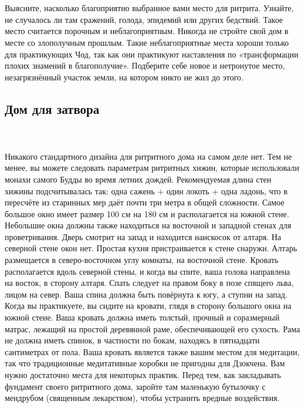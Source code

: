 \\ \\ Выясните, насколько благоприятно выбранное вами место для ритрита. Узнайте, не случалось ли там сражений, голода, эпидемий или других бедствий. Такое место считается порочным и неблагоприятным. Никогда не стройте свой дом в месте со злополучным прошлым. Такие неблагоприятные места хороши только для практикующих Чод, так как они практикуют наставления по «трансформации плохих знамений в благополучие». Подберите себе новое и нетронутое место, незагрязнённый участок земли, на котором никто не жил до этого.
\subsection{Дом для затвора}
\\ \\ Никакого стандартного дизайна для ритритного дома на самом деле нет. Тем не менее, вы можете следовать параметрам ритритных хижин, которые использовали монахи самого Будды во время летних дождей. Рекомендуемая длина стен хижины подсчитывалась так: одна сажень + один локоть + одна ладонь, что в пересчёте из старинных мер даёт почти три метра в общей сложности. Самое большое окно имеет размер 100 см на 180 см и располагается на южной стене. Небольшие окна должны также находиться на восточной и западной стенах для проветривания. Дверь смотрит на запад и находится наискосок от алтаря. На северной стене окон нет. Простая кухня пристраивается к стене снаружи. Алтарь размещается в северо-восточном углу комнаты, на восточной стене. Кровать располагается вдоль северной стены, и когда вы спите, ваша голова направлена на восток, в сторону алтаря. Спать следует на правом боку в позе спящего льва, лицом на север. Ваша спина должна быть повёрнута к югу, а ступни на запад. Когда вы практикуете, вы сидите на кровати, глядя в сторону большого окна на южной стене. Ваша кровать должна иметь толстый, прочный и соразмерный матрас, лежащий на простой деревянной раме, обеспечивающей его сухость. Рама не должна иметь спинок, в частности по бокам, находясь в пятнадцати сантиметрах от пола. Ваша кровать является также вашим местом для медитации, так что традиционные медитативные коробки не пригодны для Дзокчена. Вам нужно достаточно места для некоторых практик. Перед тем, как закладывать фундамент своего ритритного дома, заройте там маленькую бутылочку с мендрубом (священным лекарством), чтобы устранить вредные воздействия.
